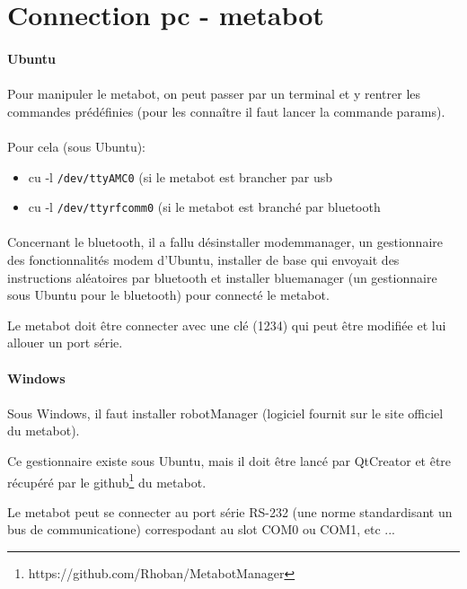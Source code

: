 \documentclass[10pt,a4paper]{report}
\begin{document}
\section{Connection pc - metabot}

\paragraph{Ubuntu}
\paragraph{}
Pour manipuler le metabot, on peut passer par un terminal et y rentrer les commandes prédéfinies (pour les connaître il faut lancer la commande params).
\paragraph{}
Pour cela (sous Ubuntu): 
\begin{itemize}
\item cu -l \texttt{/dev/ttyAMC0} (si le metabot est brancher par usb
\item cu -l \texttt{/dev/ttyrfcomm0} (si le metabot est branché par bluetooth
\end{itemize}
\paragraph{}
Concernant le bluetooth, il a fallu désinstaller modemmanager, un gestionnaire des fonctionnalités modem d'Ubuntu, installer de base qui envoyait des instructions aléatoires par bluetooth et installer bluemanager (un gestionnaire sous Ubuntu pour le bluetooth) pour connecté le metabot.

Le metabot doit être connecter avec une clé (1234) qui peut être modifiée et lui allouer un port série.
\paragraph{Windows}
\paragraph{}
Sous Windows, il faut installer robotManager (logiciel fournit sur le site officiel du metabot).

Ce gestionnaire existe sous Ubuntu, mais il doit être lancé par QtCreator et être récupéré par le github\footnote{https://github.com/Rhoban/MetabotManager} du metabot.

Le metabot peut se connecter au port série RS-232 (une norme standardisant un bus de communicatione) correspodant au slot COM0 ou COM1, etc ...
\end{document}
